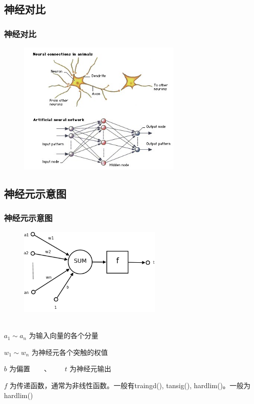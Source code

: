 \documentclass[slidestop,compress,mathserif,c]{beamer}
\begin{document}
\subsection{神经对比}
\begin{frame}
\frametitle{神经对比}
\begin{figure}
\centering
\includegraphics[width=8cm]{img1}
\end{figure}
\end{frame}


\subsection{神经元示意图}
\begin{frame}
\frametitle{神经元示意图}
\begin{figure}
\centering
\includegraphics[width=7cm]{Ncell}
\end{figure}~\\[-1.1cm]
$a_1\sim a_n$ 为输入向量的各个分量

$w_1\sim w_n$ 为神经元各个突触的权值

$b$ 为偏置~~~~、~~~~$t$ 为神经元输出

$f$ 为传递函数，通常为非线性函数。一般有traingd(), tansig(), hardlim()。一般为hardlim()


\end{frame}
\end{document}
